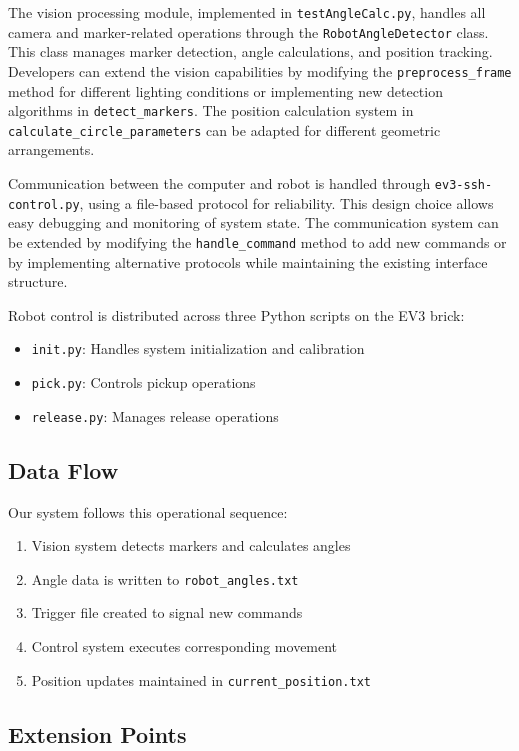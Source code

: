 \documentclass[10pt,twocolumn]{article}
\begin{document}
The vision processing module, implemented in \texttt{testAngleCalc.py}, handles all camera and marker-related operations through the \texttt{RobotAngleDetector} class. This class manages marker detection, angle calculations, and position tracking. Developers can extend the vision capabilities by modifying the \texttt{preprocess\_frame} method for different lighting conditions or implementing new detection algorithms in \texttt{detect\_markers}. The position calculation system in \texttt{calculate\_circle\_parameters} can be adapted for different geometric arrangements.

Communication between the computer and robot is handled through \texttt{ev3-ssh-control.py}, using a file-based protocol for reliability. This design choice allows easy debugging and monitoring of system state. The communication system can be extended by modifying the \texttt{handle\_command} method to add new commands or by implementing alternative protocols while maintaining the existing interface structure.

Robot control is distributed across three Python scripts on the EV3 brick:
\begin{itemize}
   \item \texttt{init.py}: Handles system initialization and calibration
   \item \texttt{pick.py}: Controls pickup operations
   \item \texttt{release.py}: Manages release operations
\end{itemize}

\subsection*{Data Flow}

Our system follows this operational sequence:
\begin{enumerate}
   \item Vision system detects markers and calculates angles
   \item Angle data is written to \texttt{robot\_angles.txt}
   \item Trigger file created to signal new commands
   \item Control system executes corresponding movement
   \item Position updates maintained in \texttt{current\_position.txt}
\end{enumerate}

\subsection*{Extension Points}
\end{document}
